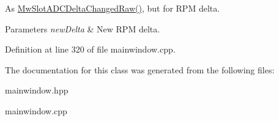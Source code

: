 As \hyperlink{class_main_window_acbdfd3592779f6946c4fecc33c79e9a4}{Mw\+Slot\+A\+D\+C\+Delta\+Changed\+Raw()}, but for R\+PM delta. 


\begin{DoxyParams}{Parameters}
{\em new\+Delta} & New R\+PM delta. \\
\hline
\end{DoxyParams}


Definition at line 320 of file mainwindow.\+cpp.



The documentation for this class was generated from the following files\+:\begin{DoxyCompactItemize}
\item 
mainwindow.\+hpp\item 
mainwindow.\+cpp\end{DoxyCompactItemize}
